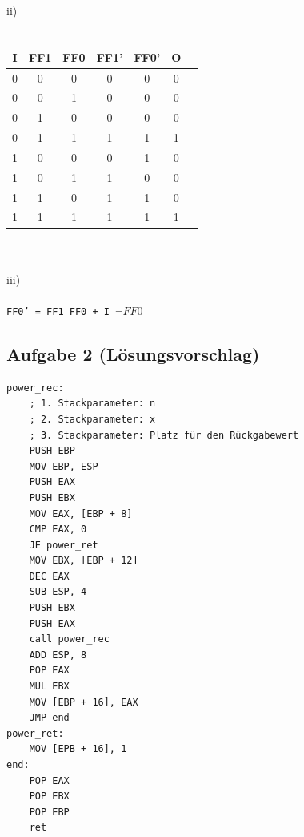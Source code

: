 \documentclass{article}
\begin{document}
ii) \\
\\
\begin{tabular}{c|c|c|c|c|c|c}
   I  & FF1 & FF0 & FF1' & FF0' & O \\
    \hline
   0   &  0   & 0   &   0   &   0   & 0  \\
    \hline
   0  &   0  &  1   &  0    &   0   &  0 \\
     \hline
   0  &  1   &  0   &   0   &   0   & 0  \\
     \hline
   0  &   1  &  1   &   1   &   1   & 1  \\
     \hline
   1  &  0   &  0   &   0   &   1   &  0 \\
     \hline
   1  &   0  &  1   &   1   &   0   &  0 \\
     \hline
   1  &  1   &  0   &   1   &   1   & 0  \\
     \hline
   1  &  1   &   1  &   1   &   1   &  1 \\
     \hline
\end{tabular} \\
 \\
iii) \\
\\
\texttt{FF0' = FF1 FF0 + I $\neg FF0$}
\label{sec:lsg01}

\subsection{Aufgabe 2 (Lösungsvorschlag)}
\begin{verbatim}
power_rec:
    ; 1. Stackparameter: n
    ; 2. Stackparameter: x
    ; 3. Stackparameter: Platz für den Rückgabewert
    PUSH EBP
    MOV EBP, ESP
    PUSH EAX
    PUSH EBX
    MOV EAX, [EBP + 8]
    CMP EAX, 0
    JE power_ret
    MOV EBX, [EBP + 12]
    DEC EAX
    SUB ESP, 4
    PUSH EBX
    PUSH EAX
    call power_rec
    ADD ESP, 8
    POP EAX
    MUL EBX
    MOV [EBP + 16], EAX
    JMP end
power_ret:
    MOV [EPB + 16], 1
end:
    POP EAX
    POP EBX
    POP EBP
    ret
\end{verbatim}
\label{sec:lsg02}
\end{document}
